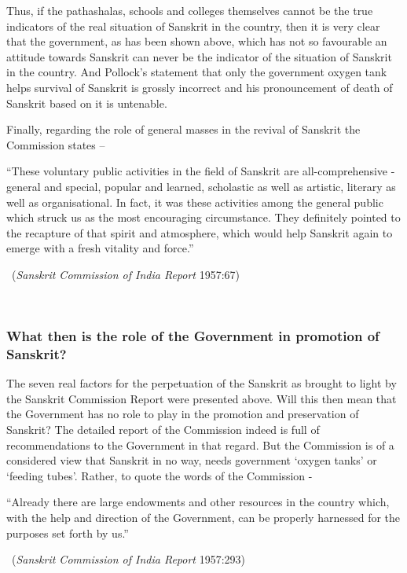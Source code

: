 Thus, if the pathashalas, schools and colleges themselves cannot be the true indicators of the real situation of Sanskrit in the country, then it is very clear that the government, as has been shown above, which has not so favourable an attitude towards Sanskrit can never be the indicator of the situation of Sanskrit in the country. And Pollock’s statement that only the government oxygen tank helps survival of Sanskrit is grossly incorrect and his pronouncement of death of Sanskrit based on it is untenable.

Finally, regarding the role of general masses in the revival of Sanskrit the Commission states – 
\begin{myquote}
\eleven
“These voluntary public activities in the field of Sanskrit are all-comprehensive - general and special, popular and learned, scholastic as well as artistic, literary as well as organisational. In fact, it was these activities among the general public which struck us as the most encouraging circumstance. They definitely pointed to the recapture of that spirit and atmosphere, which would help Sanskrit again to emerge with a fresh vitality and force.”
\vskip -5pt

~\hfill ({\sl Sanskrit Commission of India Report} 1957:67)
\end{myquote}

~\\[-40pt]

\subsubsection{What then is the role of the Government in promotion of Sanskrit?}
\vskip -5pt

The seven real factors for the perpetuation of the Sanskrit as brought to light by the Sanskrit Commission Report were presented above. Will this then mean that the Government has no role to play in the promotion and preservation of Sanskrit?  The detailed report of the Commission indeed is full of recommendations to the Government in that regard. But the Commission is of a considered view that Sanskrit in no way, needs government ‘oxygen tanks’ or ‘feeding tubes’. Rather, to quote the words of the Commission -
\begin{myquote}
\eleven
“Already there are large endowments and other resources in the country which, with the help and direction of the Government, can be properly harnessed for the purposes set forth by us.” 
\vskip -5pt

~\hfill({\sl Sanskrit Commission of India Report} 1957:293)
\end{myquote}

